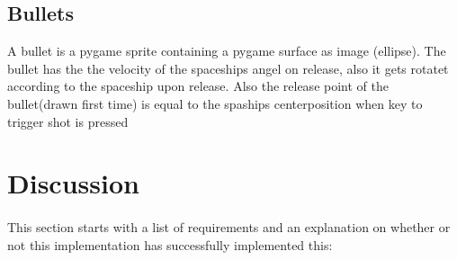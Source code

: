 \documentclass{article}
\begin{document}
\subsection{Bullets}
A bullet is a pygame sprite containing a pygame surface as image (ellipse). The bullet has the the velocity of the spaceships angel on release, also it gets rotatet according to the spaceship upon release. Also the release point of the bullet(drawn first time) is equal to the spaships centerposition when key to trigger shot is pressed


\section{Discussion}
\paragraph{}
This section starts with a list of requirements and an explanation on whether or not this implementation has successfully implemented this:
\end{document}
